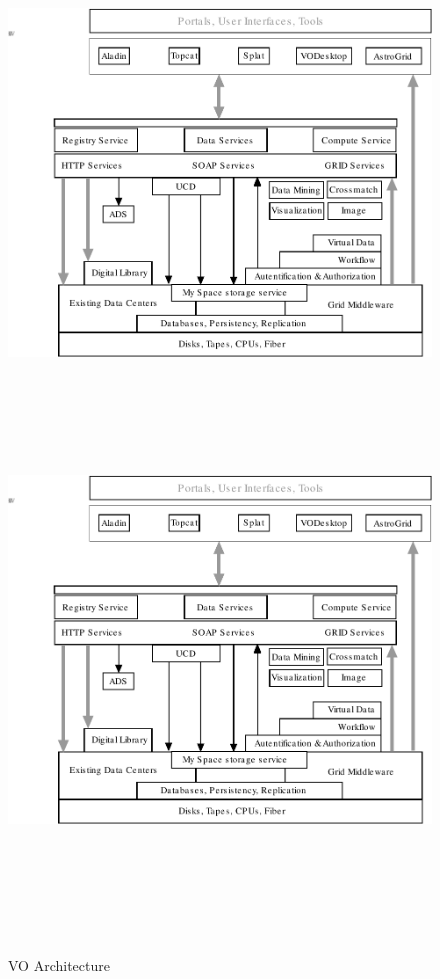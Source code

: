  
    \begin{figure}[!htbp]
      \begin{center}
        \leavevmode
        \ifpdf
        \includegraphics[scale = 1]{architecture}
        \else
        \includegraphics[bb = 92 86 545 742, height=6in]{architecture}
        \fi
      \end{center}
        \caption{VO Architecture}
        \label{FigArchitecture}
    \end{figure}

